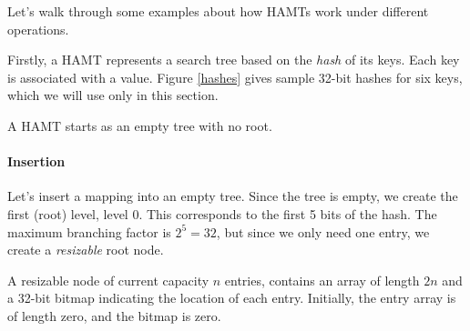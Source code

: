 \documentclass[preprint]{sigplanconf}
\begin{document}


Let's walk through some examples about how HAMTs
work under different operations.

Firstly, a HAMT represents a search tree
based on the \textit{hash} of its keys.
Each key is associated with a value.
Figure \ref{hashes} gives sample 32-bit hashes for six keys,
which we will use only in this section.

A HAMT starts as an empty tree with no root.

\paragraph{Insertion}
Let's insert a mapping into an empty tree.
Since the tree is empty, we create the
first (root) level, level 0. This corresponds
to the first 5 bits of the hash. The maximum
branching factor is $2^5=32$, but since we
only need one entry, we create a \textit{resizable}
root node.

A resizable node of current capacity $n$ entries,
contains an array of length $2n$ and a 32-bit
bitmap indicating the location of each entry.
Initially, the entry array is of length zero, and the bitmap
is zero.
\end{document}
